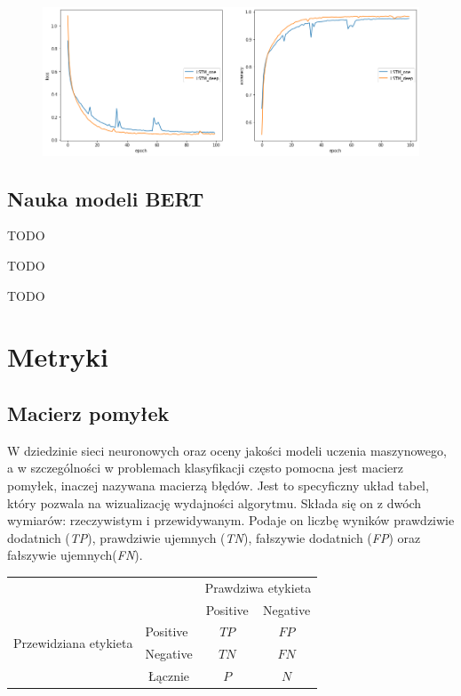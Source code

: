\begin{figure}[t]
\centering\includegraphics[width=\textwidth]{figures/reports/lstm_one_deep_comparison.png}
\label{rys:lstm_one_deep_comparison}
\end{figure}

\subsection{Nauka modeli BERT}

TODO

TODO

TODO

\section{Metryki}

\subsection{Macierz pomyłek}

W dziedzinie sieci neuronowych oraz oceny jakości modeli uczenia maszynowego, a w szczególności w problemach klasyfikacji często pomocna jest macierz pomyłek, inaczej nazywana macierzą błędów. Jest to specyficzny układ tabel, który pozwala na wizualizację wydajności algorytmu. Składa się on z dwóch wymiarów: rzeczywistym i przewidywanym. Podaje on liczbę wyników prawdziwie dodatnich (\textit{TP}), prawdziwie ujemnych (\textit{TN}), fałszywie dodatnich (\textit{FP}) oraz fałszywie ujemnych(\textit{FN}).

\begin{table}[ht]
\label{tab:tabela_matrix}
\centering\footnotesize%
\begin{tabular}{l|l|c|c|}
\multicolumn{2}{c}{}&\multicolumn{2}{c}{Prawdziwa etykieta}\\
\cline{3-4}
\multicolumn{2}{c|}{}&Positive&Negative\\
\cline{2-4}
\multirow{2}{*}{Przewidziana etykieta} & Positive & $TP$ & $FP$\\
\cline{2-4}
& Negative & $TN$ & $FN$\\
\cline{2-4}
\multicolumn{1}{c}{} & \multicolumn{1}{c}{Łącznie} & \multicolumn{1}{c}{$P$} & \multicolumn{1}{c}{$N$}\\
\end{tabular}
\end{table}

